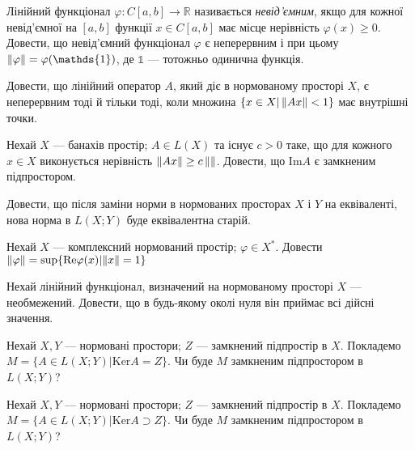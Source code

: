 
\begin{exercise}
    Лінійний функціонал $\varphi: C[a, b] \rightarrow \mathbb{R}$ називається \emph{невід'ємним},
    якщо для кожної невід'ємної на $[a ,b]$ функції $x \in C[a, b]$ має місце нерівність 
    $\varphi(x) \geq 0$. Довести, що невід'ємний функціонал $\varphi$ є неперервним і при цьому
    $\norm{\varphi} = \varphi(\mathds{1})$, де $\mathds{1}$ --- тотожньо одинична функція.
\end{exercise}

\begin{exercise}
    Довести, що лінійний оператор $A$, який діє в нормованому просторі $X$, є неперервним тоді
    й тільки тоді, коли множина $\{x \in X | \left\lVert Ax\right\rVert < 1\}$ має внутрішні точки.
\end{exercise}

\begin{exercise}
    Нехай $X$ --- банахів простір; $A \in L(X)$ та існує $c > 0$ таке, що для кожного $x \in X$
    виконується нерівність $\left\lVert Ax\right\rVert \geq c \left\lVert\right\rVert$. Довести, що $\mathrm{Im} A$ є замкненим підпростором.
\end{exercise}

\begin{exercise}
    Довести, що після заміни норми в нормованих просторах $X$ і $Y$ на еквіваленті,
    нова норма в $L(X; Y)$ буде еквівалентна старій.
\end{exercise}

\begin{exercise}
    Нехай $X$ --- комплексний нормований простір; $\varphi \in X^*$. Довести $\left\lVert\varphi\right\rVert = 
    \sup\{ \mathrm{Re}\varphi(x) | {\left\lVert x\right\rVert=1} \}$
\end{exercise}

\begin{exercise}
    Нехай лінійний функціонал, визначений на нормованому просторі  $X$ --- необмежений.
    Довести, що в будь-якому околі нуля він приймає всі дійсні значення.
\end{exercise}

\begin{exercise}
    Нехай $X,Y$ --- нормовані простори; $Z$ --- замкнений підпростір в $X$. Покладемо 
    $M = \{A \in L(X;Y) | \mathrm{Ker} A = Z\}$. Чи буде $M$ замкненим підпростором в $L(X;Y)$?
\end{exercise}

\begin{exercise}
    Нехай $X,Y$ --- нормовані простори; $Z$ --- замкнений підпростір в $X$. Покладемо 
    $M = \{A \in L(X;Y) | \mathrm{Ker} A \supset Z\}$. Чи буде $M$ замкненим підпростором в $L(X;Y)$?
\end{exercise}

